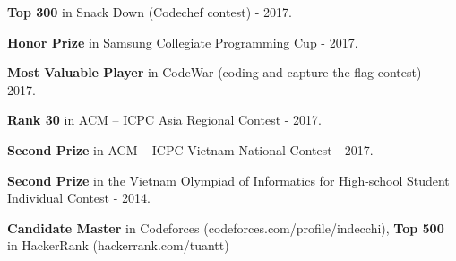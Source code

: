 
\begin{cvempty}

\begin{cvitems} %
  \item {\textbf{Top 300} in Snack Down (Codechef contest) - 2017.}
  \item {\textbf{Honor Prize} in Samsung Collegiate Programming Cup - 2017.}
  \item {\textbf{Most Valuable Player} in CodeWar (coding and capture the flag contest) - 2017.}
  \item {\textbf{Rank 30} in ACM – ICPC Asia Regional Contest - 2017.}
  \item {\textbf{Second Prize} in ACM – ICPC Vietnam National Contest - 2017.}
  \item {\textbf{Second Prize} in the Vietnam Olympiad of Informatics for High-school Student Individual Contest - 2014.}
  \item {\textbf{Candidate Master} in Codeforces (codeforces.com/profile/indecchi), \textbf{Top 500} in HackerRank (hackerrank.com/tuantt)}
\end{cvitems}

\end{cvempty}
